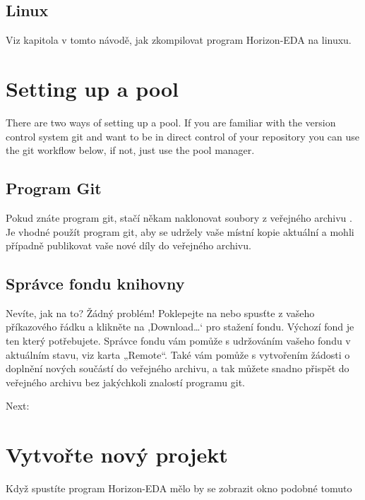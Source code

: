 \documentclass[letterpaper,10pt,czech]{sphinxmanual}
\begin{document}
\section{Linux}
\label{\detokenize{installation:linux}}
Viz kapitola
{\hyperref[\detokenize{build-linux::doc}]{}} v tomto návodě, jak zkompilovat program Horizon-EDA na linuxu.


\chapter{Setting up a pool}
\label{\detokenize{pool-setup:setting-up-a-pool}}\label{\detokenize{pool-setup::doc}}
There are two ways of setting up a pool. If you are familiar with the version control system git and want to be in direct control of your repository you can use the git workflow below, if not, just use the pool manager.


\section{Program Git}
\label{\detokenize{pool-setup:program-git}}
Pokud znáte program git, stačí někam naklonovat soubory z veřejného archivu
. Je vhodné použít program git, aby se udržely vaše místní
kopie aktuální a mohli případně publikovat vaše nové díly do veřejného archivu.


\section{Správce fondu knihovny}
\label{\detokenize{pool-setup:spravce-fondu-knihovny}}
Nevíte, jak na to? Žádný problém! Poklepejte na  nebo
spusťte  z vašeho příkazového řádku a klikněte na ‚Download…‘
pro stažení fondu. Výchozí fond  je
ten který potřebujete. Správce fondu vám pomůže s udržováním
vašeho fondu v aktuálním stavu, viz karta „Remote“. Také vám pomůže s
vytvořením žádosti o doplnění nových součástí do veřejného archivu, a tak můžete snadno přispět do veřejného archivu  bez jakýchkoli znalostí programu git.

Next: {\hyperref[\detokenize{new-project::doc}]{}}


\chapter{Vytvořte nový projekt}
\label{\detokenize{new-project:vytvorte-novy-projekt}}\label{\detokenize{new-project::doc}}
Když spustíte program Horizon-EDA mělo by se zobrazit okno podobné tomuto
\end{document}
